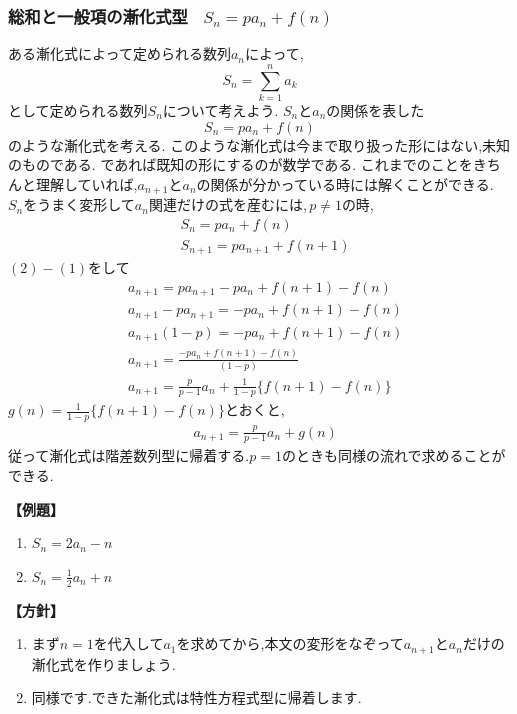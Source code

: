 
\subsubsection{総和と一般項の漸化式型 \, $S_n=pa_n+f(n)$}
ある漸化式によって定められる数列$a_n$によって,
\[
  S_n=\sum_{k=1}^{n} a_k
\]
として定められる数列$S_n$について考えよう.
$S_n$と$a_n$の関係を表した
\[
  S_n=pa_n+f(n)
\]
のような漸化式を考える.
このような漸化式は今まで取り扱った形にはない,未知のものである.
であれば既知の形にするのが数学である.
これまでのことをきちんと理解していれば,$a_{n+1}$と$a_n$の関係が分かっている時には解くことができる.
$S_n$をうまく変形して$a_{n}$関連だけの式を産むには,\,$p \neq 1$の時,
\begin{align*}
   & S_n=pa_n+f(n) \tag{1}           \\
   & S_{n+1}=pa_{n+1}+f(n+1) \tag{2}
\end{align*}
$(2)-(1)$をして
\begin{align*}
   & a_{n+1}=pa_{n+1}-pa_n+f(n+1)-f(n)                     \\
   & a_{n+1}-pa_{n+1}=-pa_n+f(n+1)-f(n)                    \\
   & a_{n+1}(1-p)=-pa_n+f(n+1)-f(n)                        \\
   & a_{n+1}=\frac{-pa_n+f(n+1)-f(n)}{(1-p)}               \\
   & a_{n+1}=\frac{p}{p-1}a_n+\frac{1}{1-p}\{f(n+1)-f(n)\}
\end{align*}
$\displaystyle g(n)=\frac{1}{1-p}\{f(n+1)-f(n)\}$とおくと,
\begin{align*}
   & a_{n+1}=\frac{p}{p-1}a_n+g(n)
\end{align*}
従って漸化式は階差数列型に帰着する.$p=1$のときも同様の流れで求めることができる.

\noindent \textbf{【例題】}
\begin{enumerate}[label=(\arabic*),parsep=3pt]
  \item $\displaystyle S_n=2a_n-n$
  \item $\displaystyle S_n=\frac12a_n+n$
\end{enumerate}

\noindent\textbf{【方針】}
\begin{enumerate}[label=(\arabic*),parsep=3pt]
  \item まず$n=1$を代入して$a_1$を求めてから,本文の変形をなぞって$a_{n+1}$と$a_n$だけの漸化式を作りましょう.
  \item 同様です.できた漸化式は特性方程式型に帰着します.
\end{enumerate}

